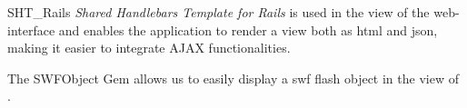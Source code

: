 SHT\_Rails \emph{Shared Handlebars Template for Rails} \citep{Rails_sht_rails} is used in the view of the web-interface and enables the application to render a view both as html and json, making it easier to integrate AJAX functionalities.

The SWFObject Gem \citep{Rails_swfobject} allows us to easily display a swf flash object in the view of \projectname{}. \\





